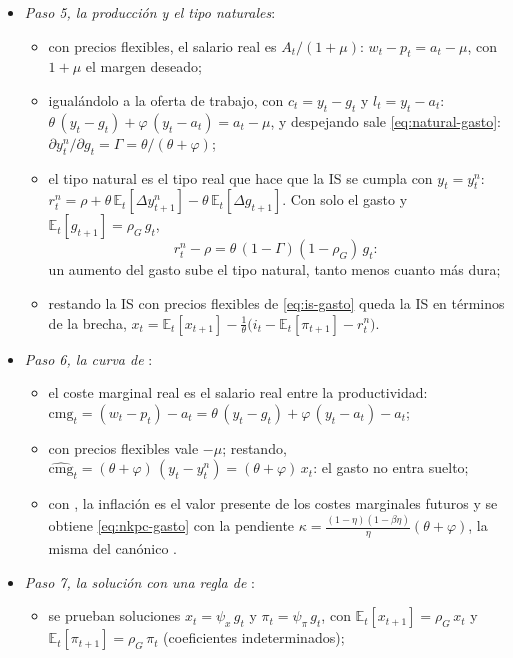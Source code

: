 \documentclass[11pt]{article}
\begin{document}
\begin{itemize}
\item \emph{Paso 5, la producción y el tipo naturales}:
  \begin{itemize}
  \item con precios flexibles, el salario real es $A_t/(1+\mu)$: $w_t-p_t=a_t-\mu$, con $1+\mu$ el margen deseado;
  \item igualándolo a la oferta de trabajo, con $c_t=y_t-g_t$ y $l_t=y_t-a_t$: $\theta\,(y_t-g_t)+\varphi\,(y_t-a_t)=a_t-\mu$, y despejando sale \eqref{eq:natural-gasto}: $\partial y^n_t/\partial g_t=\Gamma=\theta/(\theta+\varphi)$;
  \item el tipo natural es el tipo real que hace que la IS se cumpla con $y_t=y^n_t$: $r^n_t=\rho+\theta\,\mathbb{E}_t[\Delta y^n_{t+1}]-\theta\,\mathbb{E}_t[\Delta g_{t+1}]$. Con solo el gasto y $\mathbb{E}_t[g_{t+1}]=\rho_G\,g_t$,
    \begin{equation*}
    r^n_t-\rho=\theta\,(1-\Gamma)(1-\rho_G)\,g_t:
    \end{equation*}
    un aumento del gasto sube el tipo natural, tanto menos cuanto más dura;
  \item restando la IS con precios flexibles de \eqref{eq:is-gasto} queda la IS en términos de la brecha, $x_t=\mathbb{E}_t[x_{t+1}]-\frac1\theta\big(i_t-\mathbb{E}_t[\pi_{t+1}]-r^n_t\big)$.
  \end{itemize}
\item \emph{Paso 6, la curva de }:
  \begin{itemize}
  \item el coste marginal real es el salario real entre la productividad: $\mathrm{cmg}_t=(w_t-p_t)-a_t=\theta\,(y_t-g_t)+\varphi\,(y_t-a_t)-a_t$;
  \item con precios flexibles vale $-\mu$; restando, $\widehat{\mathrm{cmg}}_t=(\theta+\varphi)\,(y_t-y^n_t)=(\theta+\varphi)\,x_t$: el gasto no entra suelto;
  \item con , la inflación es el valor presente de los costes marginales futuros y se obtiene \eqref{eq:nkpc-gasto} con la pendiente $\kappa=\frac{(1-\eta)(1-\beta\eta)}{\eta}(\theta+\varphi)$, la misma del canónico .
  \end{itemize}
\item \emph{Paso 7, la solución con una regla de }:
  \begin{itemize}
  \item se prueban soluciones $x_t=\psi_x\,g_t$ y $\pi_t=\psi_\pi\,g_t$, con $\mathbb{E}_t[x_{t+1}]=\rho_G\,x_t$ y $\mathbb{E}_t[\pi_{t+1}]=\rho_G\,\pi_t$ (coeficientes indeterminados);

\end{itemize}
\end{itemize}
\end{document}
